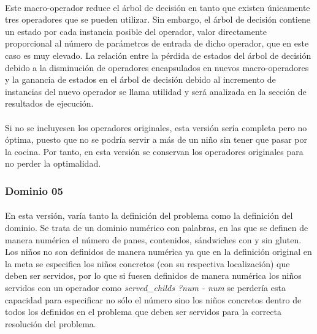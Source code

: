 \documentclass{article}
\begin{document}
\paragraph{}
Este macro-operador reduce el árbol de decisión en tanto que existen únicamente tres operadores que se pueden utilizar. Sin embargo, el árbol de decisión contiene un estado por cada instancia posible del operador, valor directamente proporcional al número de parámetros de entrada de dicho operador, que en este caso es muy elevado. La relación entre la pérdida de estados del árbol de decisión debido a la disminución de operadores encapsulados en nuevos macro-operadores y la ganancia de estados en el árbol de decisión debido al incremento de instancias del nuevo operador se llama utilidad y será analizada en la sección de resultados de ejecución.

\paragraph{}
Si no se incluyesen los operadores originales, esta versión sería completa pero no óptima, puesto que no se podría servir a más de un niño sin tener que pasar por la cocina. Por tanto, en esta versión se conservan los operadores originales para no perder la optimalidad.

\subsubsection{Dominio 05}

\paragraph{}
En esta versión, varía tanto la definición del problema como la definición del dominio. Se trata de un dominio numérico con palabras, en las que se definen de manera numérica el número de panes, contenidos, sándwiches con y sin gluten. Los niños no son definidos de manera numérica ya que en la definición original en la meta se especifica los niños concretos (con su respectiva localización) que deben ser servidos, por lo que si fuesen definidos de manera numérica los niños servidos con un operador como \textit{served\_childs ?num - num} se perdería esta capacidad para especificar no sólo el número sino los niños concretos dentro de todos los definidos en el problema que deben ser servidos para la correcta resolución del problema.
\end{document}
